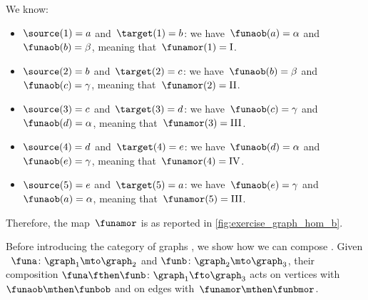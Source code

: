 {\begin{solution}
    We know:
    \begin{itemize}
        \item $\source(1)=a$ and~$\target(1)=b$: we have~$\funaob(a)=\alpha$ and~$\funaob(b)=\beta$, meaning that~$\funamor(1)=\text{I}$.
        \item $\source(2)=b$ and~$\target(2)=c$: we have~$\funaob(b)=\beta$ and~$\funaob(c)=\gamma$, meaning that~$\funamor(2)=\text{II}$.
        \item $\source(3)=c$ and~$\target(3)=d$: we have~$\funaob(c)=\gamma$ and~$\funaob(d)=\alpha$, meaning that~$\funamor(3)=\text{III}$.
        \item $\source(4)=d$ and~$\target(4)=e$: we have~$\funaob(d)=\alpha$ and~$\funaob(e)=\gamma$, meaning that~$\funamor(4)=\text{IV}$.
        \item $\source(5)=e$ and~$\target(5)=a$: we have~$\funaob(e)=\gamma$ and~$\funaob(a)=\alpha$, meaning that~$\funamor(5)=\text{III}$.
    \end{itemize}
    Therefore, the map~$\funamor$ is as reported in \cref{fig:exercise_graph_hom_b}.

    \begin{marginfigure}
        \centering
        \caption{}
        \label{fig:exercise_graph_hom_b}
    \end{marginfigure}
\end{solution}



Before introducing the category of graphs \Grph, we show how we can compose .
Given ~$\funa\colon \graph_1\mto \graph_2$ and $\funb\colon \graph_2\mto \graph_3$, their composition $\funa\fthen \funb \colon \graph_1 \fto \graph_3$ acts on vertices with~$\funaob \mthen \funbob$ and on edges with~$\funamor \mthen \funbmor$.

}
